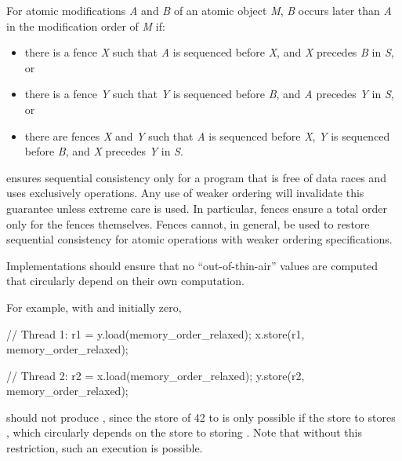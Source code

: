 \pnum
For atomic modifications \textit{A} and \textit{B} of an atomic object \textit{M},
\textit{B} occurs later than \textit{A} in the modification order of \textit{M} if:

\begin{itemize}
\item there is a  fence \textit{X} such that \textit{A}
is sequenced before \textit{X}, and \textit{X} precedes \textit{B} in \textit{S}, or
\item there is a  fence \textit{Y} such that \textit{Y}
is sequenced before \textit{B}, and \textit{A} precedes \textit{Y} in \textit{S}, or
\item there are  fences \textit{X} and \textit{Y} such that \textit{A}
is sequenced before \textit{X}, \textit{Y} is sequenced before \textit{B},
and \textit{X} precedes \textit{Y} in \textit{S}.
\end{itemize}


\pnum
\begin{note}  ensures sequential consistency only for a
program that is free of data races and uses exclusively 
operations. Any use of weaker ordering will invalidate this guarantee unless extreme
care is used. In particular,  fences ensure a total order
only for the fences themselves. Fences cannot, in general, be used to restore sequential
consistency for atomic operations with weaker ordering specifications. \end{note}

\pnum
Implementations should ensure that no ``out-of-thin-air'' values are computed that
circularly depend on their own computation.

\begin{note} For example, with  and  initially zero,

\begin{codeblock}
// Thread 1:
r1 = y.load(memory_order_relaxed);
x.store(r1, memory_order_relaxed);
\end{codeblock}

\begin{codeblock}
// Thread 2:
r2 = x.load(memory_order_relaxed);
y.store(r2, memory_order_relaxed);
\end{codeblock}

should not produce , since the store of 42 to  is only
possible if the store to  stores , which circularly depends on the
store to  storing . Note that without this restriction, such an
execution is possible.
\end{note}


